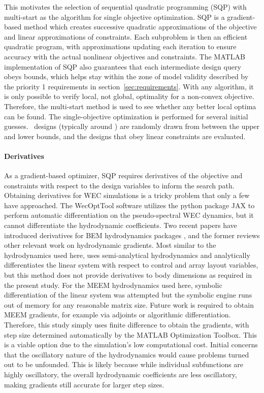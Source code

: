 This motivates the selection of sequential quadratic programming (SQP) with multi-start as the algorithm for single objective optimization.
SQP is a gradient-based method which creates successive quadratic approximations of the objective and linear approximations of constraints.
Each subproblem is then an efficient quadratic program, with approximations updating each iteration to ensure accuracy with the actual nonlinear objectives and constraints.
The MATLAB implementation of SQP also guarantees that each intermediate design query obeys bounds, which helps stay within the zone of model validity described by the priority 1 requirements in section~\ref{sec:requirements}.
With any algorithm, it is only possible to verify local, not global, optimality for a non-convex objective.
Therefore, the multi-start method is used to see whether any better local optima can be found.
The single-objective optimization is performed for several initial guesses.
\numMultistartRandom~designs (typically around \numMultistartObeyConstraint) are randomly drawn from between the upper and lower bounds, and the designs that obey linear constraints are evaluated. %

\paragraph{Derivatives}
As a gradient-based optimizer, SQP requires derivatives of the objective and constraints with respect to the design variables to inform the search path.
Obtaining derivatives for WEC simulations is a tricky problem that only a few have approached.
The WecOptTool software utilizes the python package JAX \cite{bradbury_jax_2018} to perform automatic differentiation on the pseudo-spectral WEC dynamics, but it cannot differentiate the hydrodynamic coefficients.
Two recent papers have introduced derivatives for BEM hydrodynamics packages \cite{rohrer_analytical_2024, khanal_fully_2025}, and the former reviews other relevant work on hydrodynamic gradients.
Most similar to the hydrodynamics used here, \cite{gambarini_gradient_2024} uses semi-analytical hydrodynamics and analytically differentiates the linear system with respect to control and array layout variables, but this method does not provide derivatives to body dimensions as required in the present study.
For the MEEM hydrodynamics used here, symbolic differentiation of the linear system was attempted but the symbolic engine runs out of memory for any reasonable matrix size.
Future work is required to obtain MEEM gradients, for example via adjoints or algorithmic differentiation.
Therefore, this study simply uses finite difference to obtain the gradients, with step size determined automatically by the MATLAB Optimization Toolbox.
This is a viable option due to the simulation's low computational cost.
Initial concerns that the oscillatory nature of the hydrodynamics would cause problems \cite{mccabe_open-source_2024} turned out to be unfounded.
This is likely because while individual subfunctions are highly oscillatory, the overall hydrodynamic coefficients are less oscillatory, making gradients still accurate for larger step sizes. 

